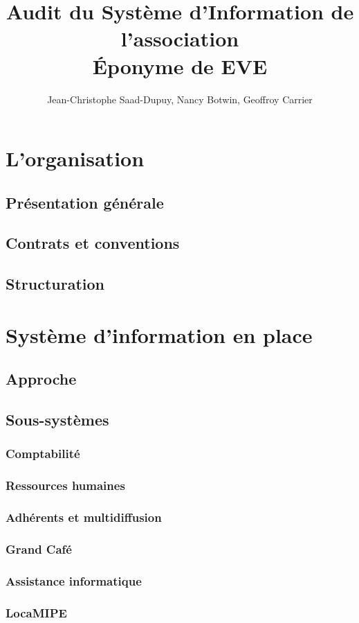\documentclass[a4wide,10pt,2pages]{report}
\title{Audit du Système d'Information de l'association \\ \Huge{Éponyme de EVE}}
\author{Jean-Christophe Saad-Dupuy, Nancy Botwin, Geoffroy Carrier}
\begin{document}
\maketitle

\tableofcontents

\section{L'organisation}
\subsection{Présentation générale}
\subsection{Contrats et conventions}
\subsection{Structuration}
\section{Système d'information en place}
\subsection{Approche}
\subsection{Sous-systèmes}
\subsubsection{Comptabilité}
\subsubsection{Ressources humaines}
\subsubsection{Adhérents et multidiffusion}
\subsubsection{Grand Café}
\subsubsection{Assistance informatique}
\subsubsection{LocaMIPE}
\end{document}

